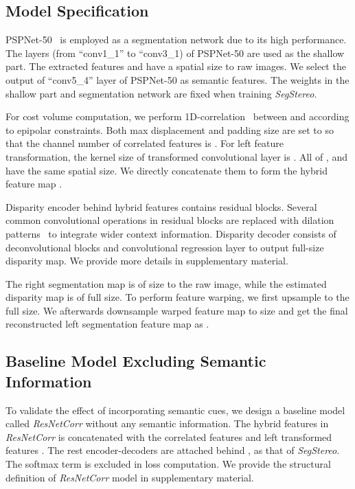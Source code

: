 \documentclass[runningheads]{llncs}
\begin{document}
\subsection{Model Specification}\label{subsec:exp_model_spec}

PSPNet-50~\cite{zhao2017pspnet} is employed as a segmentation network due to its high performance. The layers (from ``conv1\_1'' to ``conv3\_1) of PSPNet-50 are used as the shallow part. The extracted features  and  have a  spatial size to raw images. We select the output of ``conv5\_4'' layer of PSPNet-50 as semantic features. The weights in the shallow part and segmentation network are fixed when training \emph{SegStereo}.

For cost volume computation, we perform 1D-correlation~\cite{mayer2016large} between  and  according to epipolar constraints. Both max displacement and padding size are set to  so that the channel number of correlated features  is . For left feature transformation, the kernel size of transformed convolutional layer is . All of ,  and  have the same spatial size. We directly concatenate them to form the hybrid feature map .

Disparity encoder behind hybrid features  contains  residual blocks. Several common convolutional operations in residual blocks are replaced with dilation patterns~\cite{zhao2017pspnet} to integrate wider context information. Disparity decoder consists of  deconvolutional blocks and  convolutional regression layer to output full-size disparity map. We provide more details in supplementary material. 

The right segmentation map  is of  size to the raw image, while the estimated disparity map  is of full size. To perform feature warping, we first upsample  to the full size. We afterwards downsample warped feature map to  size and get the final reconstructed left segmentation feature map as .

\subsection{Baseline Model Excluding Semantic Information}
To validate the effect of incorporating semantic cues, we design a baseline model called \emph{ResNetCorr} without any semantic information. The hybrid features  in \emph{ResNetCorr} is concatenated with the correlated features  and left transformed features . The rest encoder-decoders are attached behind , as that of \emph{SegStereo}. The softmax  term is excluded in loss computation. We provide the structural definition of \emph{ResNetCorr} model in supplementary material.
\end{document}
